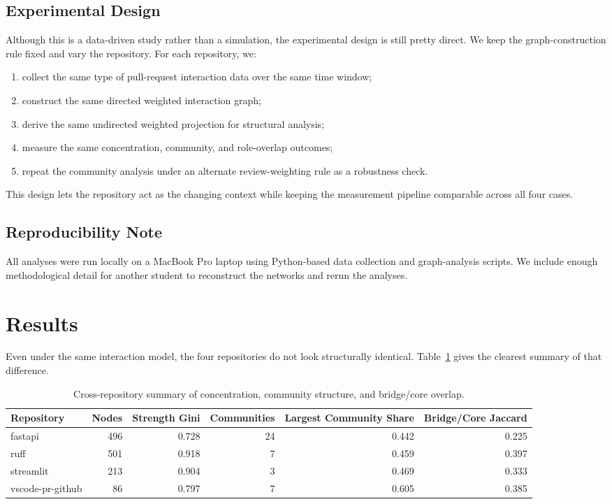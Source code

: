 \documentclass[11pt]{article}
\begin{document}
\subsection{Experimental Design}
Although this is a data-driven study rather than a simulation, the experimental design is still pretty direct. We keep the graph-construction rule fixed and vary the repository. For each repository, we:
\begin{enumerate}[leftmargin=1.5em]
    \item collect the same type of pull-request interaction data over the same time window;
    \item construct the same directed weighted interaction graph;
    \item derive the same undirected weighted projection for structural analysis;
    \item measure the same concentration, community, and role-overlap outcomes;
    \item repeat the community analysis under an alternate review-weighting rule as a robustness check.
\end{enumerate}
This design lets the repository act as the changing context while keeping the measurement pipeline comparable across all four cases.

\subsection{Reproducibility Note}
All analyses were run locally on a MacBook Pro laptop using Python-based data collection and graph-analysis scripts. We include enough methodological detail for another student to reconstruct the networks and rerun the analyses.

\section{Results}
Even under the same interaction model, the four repositories do not look structurally identical. Table~\ref{tab:summary} gives the clearest summary of that difference.

\begin{table}[H]
    \centering
    \caption{Cross-repository summary of concentration, community structure, and bridge/core overlap.}
    \label{tab:summary}
    \begin{tabular}{lrrrrr}
        \toprule
        Repository & Nodes & Strength Gini & Communities & Largest Community Share & Bridge/Core Jaccard \\
        \midrule
        fastapi & 496 & 0.728 & 24 & 0.442 & 0.225 \\
        ruff & 501 & 0.918 & 7 & 0.459 & 0.397 \\
        streamlit & 213 & 0.904 & 3 & 0.469 & 0.333 \\
        vscode-pr-github & 86 & 0.797 & 7 & 0.605 & 0.385 \\
        \bottomrule
    \end{tabular}
\end{table}
\end{document}
